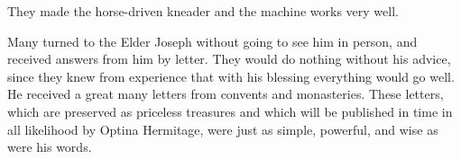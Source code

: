 They made the horse-driven kneader and the machine works very well.

Many turned to the Elder Joseph without going to see him in person, and received answers from him by letter. They would do nothing without his advice, since they knew from experience that with his blessing everything would go well. He received a great many letters from convents and monasteries. These letters, which are preserved as priceless treasures and which will be published in time in all likelihood by Optina Hermitage, were just as simple, powerful, and wise as were his words.